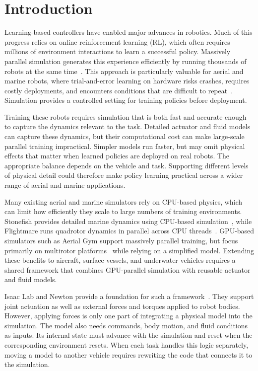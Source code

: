\section{Introduction}
\label{sec:introduction}

Learning-based controllers have enabled major advances in robotics.
%
Much of this progress relies on online reinforcement learning (RL),
which often requires millions of environment interactions to learn a
successful policy.
%
Massively parallel simulation generates this experience efficiently by
running thousands of robots at the same
time~\cite{makoviychuk2021isaacgym,mittal2025isaaclab}.
%
This approach is particularly valuable for aerial and marine robots,
where trial-and-error learning on hardware risks crashes, requires
costly deployments, and encounters conditions that are difficult to
repeat~\cite{grimaldi2025stonefish}.
%
Simulation provides a controlled setting for training policies before
deployment.

Training these robots requires simulation that is both fast and
accurate enough to capture the dynamics relevant to the task.
%
Detailed actuator and fluid models can capture these dynamics, but
their computational cost can make large-scale parallel training
impractical.
%
Simpler models run faster, but may omit physical effects that matter
when learned policies are deployed on real robots.
%
The appropriate balance depends on the vehicle and task.
%
Supporting different levels of physical detail could therefore make
policy learning practical across a wider range of aerial and marine
applications.

Many existing aerial and marine simulators rely on CPU-based physics,
which can limit how efficiently they scale to large numbers of
training environments.
%
Stonefish provides detailed marine dynamics using CPU-based
simulation~\cite{grimaldi2025stonefish}, while Flightmare runs quadrotor
dynamics in parallel across CPU
threads~\cite{song2021flightmare}.
%
GPU-based simulators such as Aerial Gym support massively parallel
training, but focus primarily on multirotor
platforms~\cite{kulkarni2025aerial} while relying on a simplified model.
%
Extending these benefits to aircraft, surface vessels, and underwater
vehicles requires a shared framework that combines GPU-parallel
simulation with reusable actuator and fluid models.

Isaac Lab and Newton provide a foundation for such a
framework~\cite{mittal2025isaaclab,newton2025}.
%
They support joint actuation as well as external forces and torques
applied to robot bodies.
%
However, applying forces is only one part of integrating a physical
model into the simulation.
%
The model also needs commands, body motion, and fluid conditions as
inputs.
%
Its internal state must advance with the simulation and reset when
the corresponding environment resets.
%
When each task handles this logic separately, moving a model to another
vehicle requires rewriting the code that connects it to the simulation.

